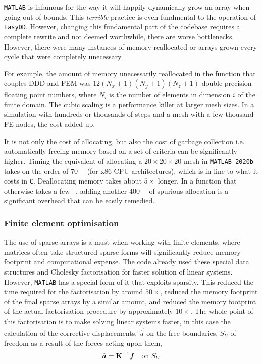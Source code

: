 \texttt{MATLAB} is infamous for the way it will happily dynamically grow an array when going out of bounds. This \emph{terrible} practice is even fundmental to the operation of \texttt{EasyDD}. However, changing this fundamental part of the codebase requires a complete rewrite and not deemed worthwhile, there are worse bottlenecks. However, there were many instances of memory reallocated or arrays grown every cycle that were completely unecessary.

For example, the amount of memory unecessarily reallocated in the function that couples DDD and FEM was $12(N_x + 1)(N_y + 1)(N_z + 1)$ double precision floating point numbers, where $N_i$ is the number of elements in dimension $i$ of the finite domain. The cubic scaling is a performance killer at larger mesh sizes. In a simulation with hundreds or thousands of steps and a mesh with a few thousand FE nodes, the cost added up.

It is not only the cost of allocating, but also the cost of garbage collection \cite{hanson1990fast} i.e. automatically freeing memory based on a set of criteria can be significantly higher. Timing the equivalent of allocating a $20 \times 20 \times 20$ mesh in \texttt{MATLAB 2020b} takes on the order of \SI{70}{\micro\sec} (for x86 CPU architectures), which is in-line to what it costs in \texttt{C}. Deallocating memory takes about $5 \times$ longer. In a function that otherwise takes a few \si{\milli\sec}, adding another \SI{400}{\micro\sec} of spurious allocation is a significant overhead that can be easily remedied.


\subsubsection{Finite element optimisation}

The use of sparse arrays is a must when working with finite elements, where matrices often take structured sparse forms will significantly reduce memory footprint and computational expense. The code already used these special data structures and Cholesky factorisation for faster solution of linear systems. However, \texttt{MATLAB} has a special form of it that exploits sparsity. This reduced the time required for the factorisation by around $50\times$, reduced the memory footprint of the final sparse arrays by a similar amount, and reduced the memory footprint of the actual factorisation procedure by approximately $10 \times$. The whole point of this factorisation is to make solving linear systems faster, in this case the calculation of the corrective displacements, $\vec{\hat{u}}$ on the free boundaries, $S_U$ of freedom as a result of the forces acting upon them,
\begin{align}
    \vec{\hat{u}} = \mtx{K}^{-1} \vec{f}\quad \text{on } S_U
\end{align}


